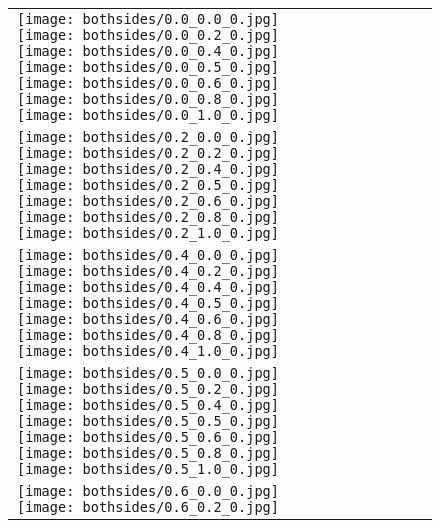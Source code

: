 \documentclass[10pt,twocolumn,letterpaper]{article}
\begin{document}
 \begin{figure}[tb!]
    \centering
    \setlength{\tabcolsep}{0.5pt}
    {\small
    \renewcommand{\arraystretch}{0.5} 
    \begin{tabular}{c c c c c c c c c c}
    \captionsetup{type=figure, font=scriptsize}
    \raisebox{0.1in}{\rotatebox{90}{\small \emph{}
 }}
  \texttt{[image: bothsides/0.0\_0.0\_0.jpg]}
  \texttt{[image: bothsides/0.0\_0.2\_0.jpg]}
  \texttt{[image: bothsides/0.0\_0.4\_0.jpg]}
  \texttt{[image: bothsides/0.0\_0.5\_0.jpg]}
  \texttt{[image: bothsides/0.0\_0.6\_0.jpg]}
  \texttt{[image: bothsides/0.0\_0.8\_0.jpg]}
  \texttt{[image: bothsides/0.0\_1.0\_0.jpg]}
 \tabularnewline
     \raisebox{0.1in}{\rotatebox{90}{\small \emph{}
 }}
  \texttt{[image: bothsides/0.2\_0.0\_0.jpg]}
  \texttt{[image: bothsides/0.2\_0.2\_0.jpg]}
  \texttt{[image: bothsides/0.2\_0.4\_0.jpg]}
  \texttt{[image: bothsides/0.2\_0.5\_0.jpg]}
  \texttt{[image: bothsides/0.2\_0.6\_0.jpg]}
  \texttt{[image: bothsides/0.2\_0.8\_0.jpg]}
  \texttt{[image: bothsides/0.2\_1.0\_0.jpg]}
\tabularnewline
    \raisebox{0.1in}{\rotatebox{90}{\small \emph{}
 }}
  \texttt{[image: bothsides/0.4\_0.0\_0.jpg]}
  \texttt{[image: bothsides/0.4\_0.2\_0.jpg]}
  \texttt{[image: bothsides/0.4\_0.4\_0.jpg]}
  \texttt{[image: bothsides/0.4\_0.5\_0.jpg]}
  \texttt{[image: bothsides/0.4\_0.6\_0.jpg]}
  \texttt{[image: bothsides/0.4\_0.8\_0.jpg]}
  \texttt{[image: bothsides/0.4\_1.0\_0.jpg]}
\tabularnewline
    \raisebox{0.1in}{\rotatebox{90}{\small \emph{}
 }}
  \texttt{[image: bothsides/0.5\_0.0\_0.jpg]}
  \texttt{[image: bothsides/0.5\_0.2\_0.jpg]}
  \texttt{[image: bothsides/0.5\_0.4\_0.jpg]}
  \texttt{[image: bothsides/0.5\_0.5\_0.jpg]}
  \texttt{[image: bothsides/0.5\_0.6\_0.jpg]}
  \texttt{[image: bothsides/0.5\_0.8\_0.jpg]}
  \texttt{[image: bothsides/0.5\_1.0\_0.jpg]}
\tabularnewline
    \raisebox{0.1in}{\rotatebox{90}{\small \emph{}
 }}
  \texttt{[image: bothsides/0.6\_0.0\_0.jpg]}
  \texttt{[image: bothsides/0.6\_0.2\_0.jpg]}

\end{tabular}}
\end{figure}
\end{document}
